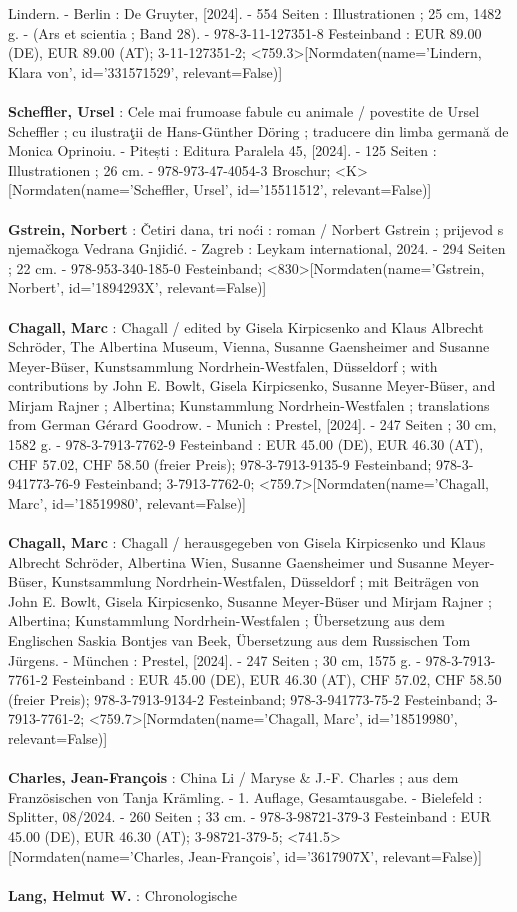 \documentclass{article}
\begin{document}
\begin{multicols}{3}
Lindern. - Berlin : De Gruyter, [2024]. - 554 Seiten : Illustrationen ; 25 cm, 1482 g. - (Ars et scientia ; Band 28). - 978-3-11-127351-8 Festeinband : EUR 89.00 (DE), EUR 89.00 (AT); 3-11-127351-2; <759.3>[Normdaten(name='Lindern, Klara von', id='331571529', relevant=False)]\\\\\textbf{Scheffler, Ursel} : Cele mai frumoase fabule cu animale / povestite de Ursel Scheffler ; cu ilustraţii de Hans-Günther Döring ; traducere din limba germană de Monica Oprinoiu. - Pitești : Editura Paralela 45, [2024]. - 125 Seiten : Illustrationen ; 26 cm. - 978-973-47-4054-3 Broschur; <K>[Normdaten(name='Scheffler, Ursel', id='15511512', relevant=False)]\\\\\textbf{Gstrein, Norbert} : Četiri dana, tri noći : roman / Norbert Gstrein ; prijevod s njemačkoga Vedrana Gnjidić. - Zagreb : Leykam international, 2024. - 294 Seiten ; 22 cm. - 978-953-340-185-0 Festeinband; <830>[Normdaten(name='Gstrein, Norbert', id='1894293X', relevant=False)]\\\\\textbf{Chagall, Marc} : Chagall / edited by Gisela Kirpicsenko and Klaus Albrecht Schröder, The Albertina  Museum, Vienna, Susanne Gaensheimer and Susanne Meyer-Büser, Kunstsammlung Nordrhein-Westfalen, Düsseldorf ; with contributions by John E. Bowlt, Gisela Kirpicsenko, Susanne Meyer-Büser, and Mirjam Rajner ; Albertina; Kunstammlung Nordrhein-Westfalen ; translations from German Gérard Goodrow. - Munich : Prestel, [2024]. - 247 Seiten ; 30 cm, 1582 g. - 978-3-7913-7762-9 Festeinband : EUR 45.00 (DE), EUR 46.30 (AT), CHF 57.02, CHF 58.50 (freier Preis); 978-3-7913-9135-9 Festeinband; 978-3-941773-76-9 Festeinband; 3-7913-7762-0; <759.7>[Normdaten(name='Chagall, Marc', id='18519980', relevant=False)]\\\\\textbf{Chagall, Marc} : Chagall / herausgegeben von Gisela Kirpicsenko und Klaus Albrecht Schröder, Albertina Wien, Susanne Gaensheimer und Susanne Meyer-Büser, Kunstsammlung Nordrhein-Westfalen, Düsseldorf ; mit Beiträgen von John E. Bowlt, Gisela Kirpicsenko, Susanne Meyer-Büser und Mirjam Rajner ; Albertina; Kunstammlung Nordrhein-Westfalen ; Übersetzung aus dem Englischen Saskia Bontjes van Beek, Übersetzung aus dem Russischen Tom Jürgens. - München : Prestel, [2024]. - 247 Seiten ; 30 cm, 1575 g. - 978-3-7913-7761-2 Festeinband : EUR 45.00 (DE), EUR 46.30 (AT), CHF 57.02, CHF 58.50 (freier Preis); 978-3-7913-9134-2 Festeinband; 978-3-941773-75-2 Festeinband; 3-7913-7761-2; <759.7>[Normdaten(name='Chagall, Marc', id='18519980', relevant=False)]\\\\\textbf{Charles, Jean-François} : China Li / Maryse \& J.-F. Charles ; aus dem Französischen von Tanja Krämling. - 1. Auflage, Gesamtausgabe. - Bielefeld : Splitter, 08/2024. - 260 Seiten ; 33 cm. - 978-3-98721-379-3 Festeinband : EUR 45.00 (DE), EUR 46.30 (AT); 3-98721-379-5; <741.5>[Normdaten(name='Charles, Jean-François', id='3617907X', relevant=False)]\\\\\textbf{Lang, Helmut W.} : Chronologische 
\end{multicols}
\end{document}
